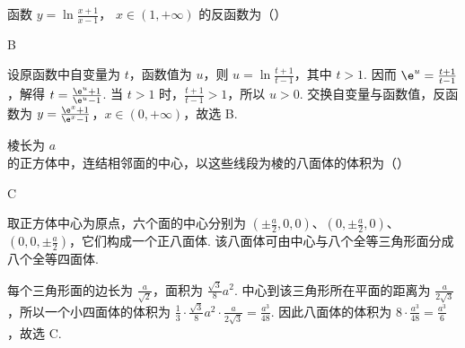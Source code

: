 \begin{problem}
函数 \( y = \ln \frac{x + 1}{x - 1} \)， \( x \in (1, +\infty) \) 的反函数为（\quad）
\begin{answer}
B
\end{answer}

\begin{solution}
设原函数中自变量为 \(t\)，函数值为 \(u\)，则 \(u=\ln\frac{t+1}{t-1}\)，其中 \(t>1\). 因而 \(\e^{u}=\frac{t+1}{t-1}\)，解得
\(t=\frac{\e^{u}+1}{\e^{u}-1}\).
当 \(t>1\) 时，\(\frac{t+1}{t-1}>1\)，所以 \(u>0\). 交换自变量与函数值，反函数为 \(y=\frac{\e^{x}+1}{\e^{x}-1}\)，\(x\in(0,+\infty)\)，故选 B.
\end{solution}
\end{problem}

\begin{problem}
棱长为 \(a\) 的正方体中，连结相邻面的中心，以这些线段为棱的八面体的体积为（\quad）
\begin{answer}
C
\end{answer}

\begin{solution}
取正方体中心为原点，六个面的中心分别为 \(\left(\pm\frac{a}{2},0,0\right)\)、\(\left(0,\pm\frac{a}{2},0\right)\)、\(\left(0,0,\pm\frac{a}{2}\right)\)，它们构成一个正八面体. 该八面体可由中心与八个全等三角形面分成八个全等四面体.

每个三角形面的边长为 \(\frac{a}{\sqrt{2}}\)，面积为 \(\frac{\sqrt{3}}{8}a^{2}\). 中心到该三角形所在平面的距离为 \(\frac{a}{2\sqrt{3}}\)，所以一个小四面体的体积为
\(\frac{1}{3}\cdot\frac{\sqrt{3}}{8}a^{2}\cdot\frac{a}{2\sqrt{3}}=\frac{a^{3}}{48}\).
因此八面体的体积为 \(8\cdot\frac{a^{3}}{48}=\frac{a^{3}}{6}\)，故选 C.
\end{solution}
\end{problem}


